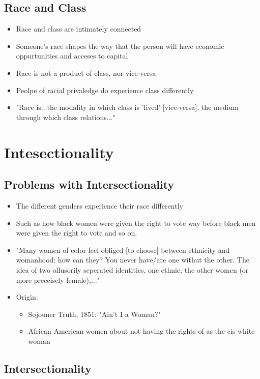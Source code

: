 \documentclass{article}
\begin{document}
\subsection{Race and Class}
\begin{itemize}
  \item Race and class are intimately connected
  \item Someone's race shapes the way that the person will have economic oppurtunities 
    and acceses to capital
  \item Race is not a product of class, nor vice-versa
  \item Peolpe of racial privaledge do experience class differently
  \item "Race is...the modality in which class is 'lived' [vice-versa], the medium through which class relations..."
\end{itemize}

\section{Intesectionality}

\subsection{Problems with Intersectionality}
\begin{itemize}
  \item The different genders experience their race differently
  \item Such as how black women were given the right to vote way before black men were given the right to vote and so on.
  \item "Many women of color feel obliged [to choose] between ethnicity and womanhood: how can they?
    You never have/are one withut the other. The idea of two ollusorily seperated identities, one ethnic, the other women (or more preceisely female),..."
  \item Origin:
    \begin{itemize}
      \item Sojouner Truth, 1851: 
        "Ain't I a Woman?"
      \item African American women about not having the rights of as the cis white woman
    \end{itemize}
\end{itemize}

\pagebreak

\subsection{Intersectionality}
\end{document}
